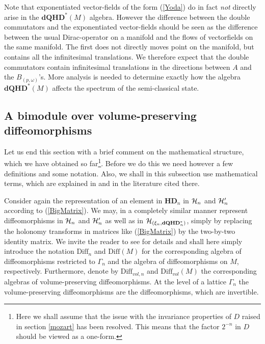 \documentclass[12pt]{article}
\def\G{\Gamma}
\def\ch{{\cal H}}
\begin{document}
Note that exponentiated vector-fields of the form (\ref{Yoda}) do in fact {\it not} directly arise in the $\mathbf{dQHD}^*(M)$ algebra. However the difference between the double commutators and the exponentiated vector-fields should be seen as the difference between the usual Dirac-operator on a manifold and the flows of vectorfields on the same manifold. The first does not directly moves point on the manifold, but contains all the infinitesimal translations. We therefore expect that the double commutators contain infinitesimal translations in the directions between $A$ and the $B_{(p,\omega)}$'s. More analysis is needed to determine exactly how the algebra $\mathbf{dQHD}^*(M)$ affects the spectrum of the semi-classical state.
















\subsection{A bimodule over volume-preserving diffeomorphisms}
\label{lahar}

Let us end this section with a brief comment on the mathematical structure, which we have obtained so far\footnote{Here we shall assume that the issue with the invariance properties of $D$ raised in section \ref{mozart} has been resolved. This means that the factor $2^{-n}$ in $D$ should be viewed as a one-form.}.
 Before we do this we need however a few definitions and some notation. Also, we shall in this subsection use mathematical terms, which are explained in \cite{Aastrup:2012vq} and in the literature cited there. %





Consider again the representation of an element in $\mathbf{HD}_n$ in $\ch_n$ and $\ch_n'$ according to (\ref{BigMatrix}). We may, in a completely similar manner represent diffeomorphisms in $\ch_n$ and $\ch'_n$ as well as  in $\ch_{(\xi_n,\mathbf{dQHD}^*_n)}$, simply by replacing the holonomy transforms in matrices like (\ref{BigMatrix}) by the two-by-two identity matrix. We invite the reader to see \cite{Aastrup:2012vq} for details and shall here simply introduce the notation $\mbox{Diff}_n$ and $\mbox{Diff}(M)$ for the corresponding algebra of diffeomorphisms restricted to $\G_n$ and the algebra of diffeomorphisms on $M$, respectively. Furthermore, denote by $\mbox{Diff}_{vol,n}$ and $\mbox{Diff}_{vol}(M)$ the corresponding algebras of volume-preserving diffeomorphisms. At the level of a lattice $\G_n$ the volume-preserving diffeomorphisms are the diffeomorphisms, which are invertible.
\end{document}
